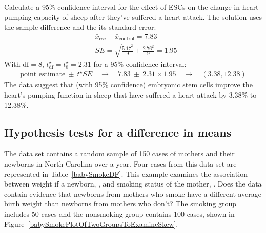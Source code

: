 \begin{example}{Calculate a 95\% confidence interval for the effect of ESCs on the change in heart pumping capacity of sheep after they've suffered a heart attack.}
The solution uses the sample difference and the its standard error:\textC{\vspace{-3mm}}
\begin{align*}
& \bar{x}_{\text{esc}} - \bar{x}_{\text{control}} = 7.83 \\
& SE = \sqrt{\frac{5.17^2}{9} + \frac{2.76^2}{9}} = 1.95
\end{align*}
With $\text{df} = 8$,  $t^{\star}_{\text{df}} = t^{\star}_{8} = 2.31$ for a 95\% confidence interval:\textC{\vspace{-1mm}}
\begin{align*}
\text{point estimate} \ \pm\ t^{\star}SE \quad\rightarrow\quad
7.83 \ \pm\ 2.31\times 1.95 \quad\rightarrow\quad (3.38, 12.38)
\end{align*}
The data suggest that (with 95\% confidence) embryonic stem cells improve the heart's pumping function in sheep that have suffered a heart attack by 3.38\% to 12.38\%.
\end{example}



\subsection{Hypothesis tests for a difference in means}
\label{testingDifferenceMeans}


The data set  contains a random sample of 150 cases of mothers and their newborns in North Carolina over a year. Four cases from this data set are represented in Table~\ref{babySmokeDF}. This example examines the association between weight if a newborn, , and smoking status of the mother, .  Does the data contain  evidence that newborns from mothers who smoke have a different average birth weight than newborns from mothers who don't?  The smoking group includes 50 cases and the nonsmoking group contains 100 cases, shown in Figure~\ref{babySmokePlotOfTwoGroupsToExamineSkew}.

